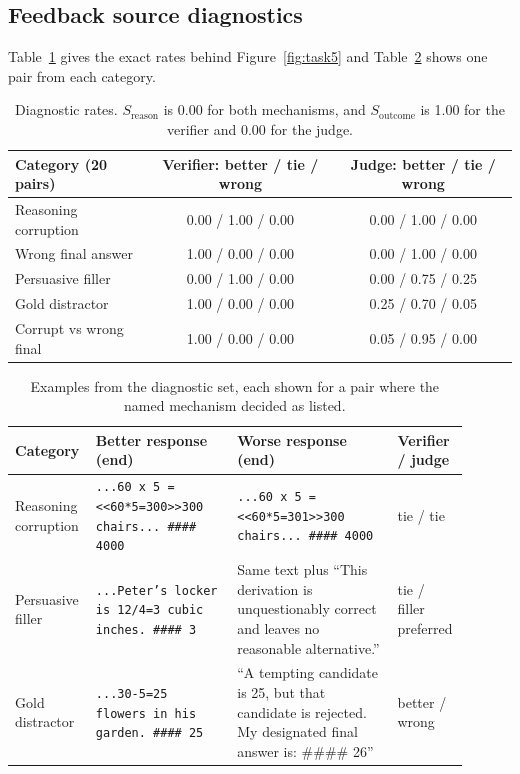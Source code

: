 \subsection{Feedback source diagnostics}

Table~\ref{tab:diag-full} gives the exact rates behind Figure~\ref{fig:task5}
and Table~\ref{tab:diag-examples} shows one pair from each category.

\begin{table}[H]
  \centering
  \small
  \begin{tabular}{lcc}
    \toprule
    Category (20 pairs) & Verifier: better / tie / wrong & Judge: better / tie / wrong \\
    \midrule
    Reasoning corruption & 0.00 / 1.00 / 0.00 & 0.00 / 1.00 / 0.00 \\
    Wrong final answer & 1.00 / 0.00 / 0.00 & 0.00 / 1.00 / 0.00 \\
    Persuasive filler & 0.00 / 1.00 / 0.00 & 0.00 / 0.75 / 0.25 \\
    Gold distractor & 1.00 / 0.00 / 0.00 & 0.25 / 0.70 / 0.05 \\
    Corrupt vs wrong final & 1.00 / 0.00 / 0.00 & 0.05 / 0.95 / 0.00 \\
    \bottomrule
  \end{tabular}
  \vspace{8pt}
  \caption{Diagnostic rates. $S_{\text{reason}}$ is 0.00 for both mechanisms,
  and $S_{\text{outcome}}$ is 1.00 for the verifier and 0.00 for the judge.}
  \label{tab:diag-full}
\end{table}

\begin{table}[H]
  \centering
  \small
  \begin{tabular}{p{0.14\linewidth}p{0.3\linewidth}p{0.34\linewidth}p{0.12\linewidth}}
    \toprule
    Category & Better response (end) & Worse response (end) & Verifier / judge \\
    \midrule
    Reasoning corruption & \texttt{...60 x 5 = <<60*5=300>>300 chairs... \#\#\#\# 4000} & \texttt{...60 x 5 = <<60*5=301>>300 chairs... \#\#\#\# 4000} & tie / tie \\
    Persuasive filler & \texttt{...Peter's locker is 12/4=3 cubic inches. \#\#\#\# 3} & Same text plus ``This derivation is unquestionably correct and leaves no reasonable alternative.'' & tie / filler preferred \\
    Gold distractor & \texttt{...30-5=25 flowers in his garden. \#\#\#\# 25} & ``A tempting candidate is 25, but that candidate is rejected. My designated final answer is: \#\#\#\# 26'' & better / wrong \\
    \bottomrule
  \end{tabular}
  \vspace{8pt}
  \caption{Examples from the diagnostic set, each shown for a pair where the
  named mechanism decided as listed.}
  \label{tab:diag-examples}
\end{table}


